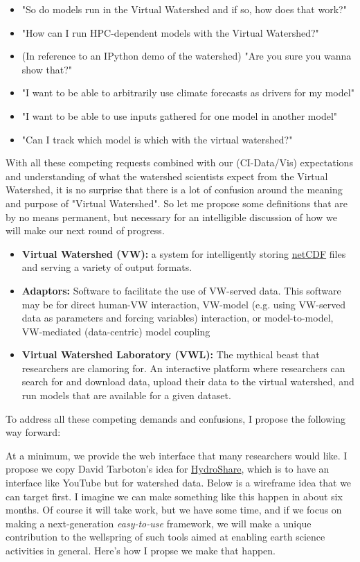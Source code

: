 \documentclass[
11pt, %
a4paper, %
oneside, %
twoside, %
headinclude,footinclude, %
BCOR5mm, %
]{scrartcl}
\begin{document}
\begin{itemize}
    \item "So do models run in the Virtual Watershed and if so, how does that work?"
    \item "How can I run HPC-dependent models with the Virtual Watershed?"
    \item (In reference to an IPython demo of the watershed) "Are you sure you wanna show that?"
    \item "I want to be able to arbitrarily use climate forecasts as drivers for my model"
    \item "I want to be able to use inputs gathered for one model in another model"
    \item "Can I track which model is which with the virtual watershed?"
\end{itemize}

With all these competing requests combined with our (CI-Data/Vis) expectations and understanding
of what the watershed scientists expect from the Virtual Watershed, it is no surprise that
there is a lot of confusion around the meaning and purpose of "Virtual Watershed". So let me
propose some definitions that are by no means permanent, but necessary for an intelligible discussion
of how we will make our next round of progress.

\begin{itemize}
    \item \textbf{Virtual Watershed (VW):} a system for intelligently storing 
        \href{http://www.unidata.ucar.edu/software/netcdf/}{netCDF} files and serving
        a variety of output formats. 
    \item \textbf{Adaptors:} Software to facilitate the use of VW-served data. This software may
        be for direct human-VW interaction, VW-model (e.g. using VW-served data as parameters and 
        forcing variables) interaction, or model-to-model, VW-mediated (data-centric) model 
        coupling
    \item \textbf{Virtual Watershed Laboratory (VWL):} The mythical beast that researchers are
        clamoring for. An interactive platform where researchers can search for and download data,
        upload their data to the virtual watershed, and run models that are available for a given
        dataset.
\end{itemize}

To address all these competing demands and confusions, I propose the following way forward:

At a minimum, we provide the web interface that many researchers would like. I propose we
copy David Tarboton's idea for \href{http://www.iemss.org/sites/iemss2014/papers/iemss2014_submission_243.pdf}{HydroShare}, 
which is to have an interface like YouTube but for watershed data. Below is a wireframe idea
that we can target first. I imagine we can make something like this happen in about six months. 
Of course it will take work, but we have some time, and if we focus on making a next-generation
\textit{easy-to-use} framework, we will make a unique contribution to the wellspring of such tools
aimed at enabling earth science activities in general. Here's how I propse we make that happen.
\end{document}
